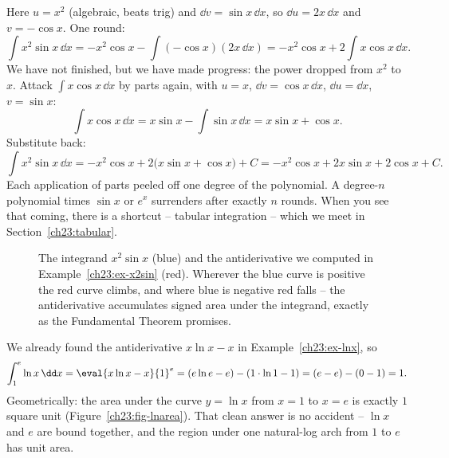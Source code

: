 \begin{example}
\label{ch23:ex-x2sin}
Here $u=x^2$ (algebraic, beats trig) and $\dd v = \sin x\,\dd x$, so
$\dd u = 2x\,\dd x$ and $v = -\cos x$. One round:
\[
\int x^2\sin x\,\dd x = -x^2\cos x - \int(-\cos x)(2x\,\dd x)
= -x^2\cos x + 2\int x\cos x\,\dd x.
\]
We have not finished, but we have made progress: the power dropped from $x^2$ to
$x$. Attack $\int x\cos x\,\dd x$ by parts again, with $u=x$,
$\dd v = \cos x\,\dd x$, $\dd u = \dd x$, $v = \sin x$:
\[
\int x\cos x\,\dd x = x\sin x - \int \sin x\,\dd x = x\sin x + \cos x.
\]
Substitute back:
\[
\int x^2\sin x\,\dd x = -x^2\cos x + 2\big(x\sin x + \cos x\big) + C
= -x^2\cos x + 2x\sin x + 2\cos x + C.
\]
Each application of parts peeled off one degree of the polynomial. A degree-$n$
polynomial times $\sin x$ or $e^x$ surrenders after exactly $n$ rounds. When you
see that coming, there is a shortcut -- tabular integration -- which we meet in
Section~\ref{ch23:tabular}.
\end{example}

\begin{figure}[H]
\centering
{}
\caption{The integrand $x^2\sin x$ (blue) and the antiderivative we computed in
Example~\ref{ch23:ex-x2sin} (red). Wherever the blue curve is positive the red
curve climbs, and where blue is negative red falls -- the antiderivative
accumulates signed area under the integrand, exactly as the Fundamental Theorem
promises.}
\label{ch23:fig-x2sin}
\end{figure}

\begin{example}
\label{ch23:ex-deflnx}
We already found the antiderivative $x\ln x - x$ in Example~\ref{ch23:ex-lnx}, so
\[
\int_1^{e} \ln x\,\dd x = \eval{x\ln x - x}{1}^{e}
= (e\ln e - e) - (1\cdot\ln 1 - 1)
= (e - e) - (0 - 1) = 1.
\]
Geometrically: the area under the curve $y=\ln x$ from $x=1$ to $x=e$ is exactly
$1$ square unit (Figure~\ref{ch23:fig-lnarea}). That clean answer is no
accident -- $\ln x$ and $e$ are bound together, and the region under one
natural-log arch from $1$ to $e$ has unit area.
\end{example}

